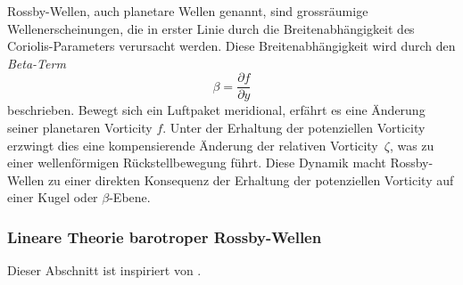
Rossby-Wellen, auch planetare Wellen genannt, sind grossräumige
Wellenerscheinungen, die in erster Linie durch die Breitenabhängigkeit des
Coriolis-Parameters verursacht werden. Diese Breitenabhängigkeit wird durch den \emph{Beta-Term}
\begin{equation}
	\beta = \frac{\partial f}{\partial y}
	\label{rossby:eq:beta_term}
\end{equation}
beschrieben. Bewegt sich ein Luftpaket meridional, erfährt es eine Änderung seiner planetaren Vorticity \(f\). Unter der Erhaltung der potenziellen Vorticity erzwingt dies eine kompensierende Änderung der relativen Vorticity~\(\zeta\), was zu einer wellenförmigen Rückstellbewegung führt.
Diese Dynamik macht Rossby-Wellen zu einer direkten Konsequenz der Erhaltung der potenziellen Vorticity auf einer Kugel oder \(\beta\)-Ebene.

\subsubsection{Lineare Theorie barotroper Rossby-Wellen}

Dieser Abschnitt ist inspiriert von \cite{rossby:mueller2018}.

